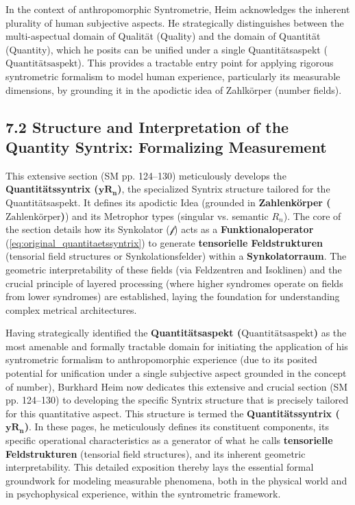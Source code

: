 \documentclass[12pt]{article}
\newcommand{\quantitaetsaspekt}{\text{Quantitätsaspekt}}
\newcommand{\quantitaetssyntrix}{\bm{yR_n}}
\newcommand{\zahlenkoerper}{\text{Zahlenkörper}}
\newcommand{\funktionaloperator}{\mathcal{f}}
\begin{document}
In the context of anthropomorphic Syntrometrie, Heim acknowledges the inherent plurality of human subjective aspects. He strategically distinguishes between the multi-aspectual domain of Qualität (Quality) and the domain of Quantität (Quantity), which he posits can be unified under a single Quantitätsaspekt (\(\quantitaetsaspekt\)). This provides a tractable entry point for applying rigorous syntrometric formalism to model human experience, particularly its measurable dimensions, by grounding it in the apodictic idea of Zahlkörper (number fields).

\subsection{7.2 Structure and Interpretation of the Quantity Syntrix: Formalizing Measurement}
\label{sec:quantity_syntrix}

This extensive section (SM pp. 124–130) meticulously develops the \textbf{Quantitätssyntrix (\(\quantitaetssyntrix\))}, the specialized Syntrix structure tailored for the Quantitätsaspekt. It defines its apodictic Idea (grounded in \textbf{Zahlenkörper (\(\zahlenkoerper\))}) and its Metrophor types (singular vs. semantic \(R_n\)). The core of the section details how its Synkolator (\(\funktionaloperator\)) acts as a \textbf{Funktionaloperator} (\eqref{eq:original_quantitaetssyntrix}) to generate \textbf{tensorielle Feldstrukturen} (tensorial field structures or Synkolationsfelder) within a \textbf{Synkolatorraum}. The geometric interpretability of these fields (via Feldzentren and Isoklinen) and the crucial principle of layered processing (where higher syndromes operate on fields from lower syndromes) are established, laying the foundation for understanding complex metrical architectures.

Having strategically identified the \textbf{Quantitätsaspekt (\(\quantitaetsaspekt\))} as the most amenable and formally tractable domain for initiating the application of his syntrometric formalism to anthropomorphic experience (due to its posited potential for unification under a single subjective aspect grounded in the concept of number), Burkhard Heim now dedicates this extensive and crucial section (SM pp. 124–130) to developing the specific Syntrix structure that is precisely tailored for this quantitative aspect. This structure is termed the \textbf{Quantitätssyntrix (\(\quantitaetssyntrix\))}. In these pages, he meticulously defines its constituent components, its specific operational characteristics as a generator of what he calls \textbf{tensorielle Feldstrukturen} (tensorial field structures), and its inherent geometric interpretability. This detailed exposition thereby lays the essential formal groundwork for modeling measurable phenomena, both in the physical world and in psychophysical experience, within the syntrometric framework.
\end{document}

